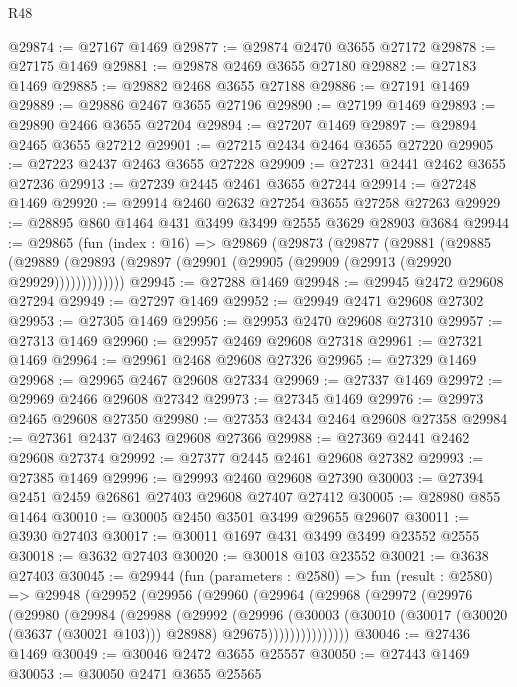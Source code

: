 \begin{lexlean}{R48}
\begin{coremodule}
@29874 := @27167 @1469
@29877 := @29874 @2470 @3655 @27172
@29878 := @27175 @1469
@29881 := @29878 @2469 @3655 @27180
@29882 := @27183 @1469
@29885 := @29882 @2468 @3655 @27188
@29886 := @27191 @1469
@29889 := @29886 @2467 @3655 @27196
@29890 := @27199 @1469
@29893 := @29890 @2466 @3655 @27204
@29894 := @27207 @1469
@29897 := @29894 @2465 @3655 @27212
@29901 := @27215 @2434 @2464 @3655 @27220
@29905 := @27223 @2437 @2463 @3655 @27228
@29909 := @27231 @2441 @2462 @3655 @27236
@29913 := @27239 @2445 @2461 @3655 @27244
@29914 := @27248 @1469
@29920 := @29914 @2460 @2632 @27254 @3655 @27258 @27263
@29929 := @28895 @860 @1464 @431 @3499 @3499 @2555 @3629 @28903 @3684
@29944 := @29865
    (fun (index : @16) =>
    @29869
      (@29873
        (@29877
          (@29881
            (@29885
              (@29889 (@29893 (@29897 (@29901 (@29905 (@29909 (@29913 (@29920 @29929)))))))))))))
@29945 := @27288 @1469
@29948 := @29945 @2472 @29608 @27294
@29949 := @27297 @1469
@29952 := @29949 @2471 @29608 @27302
@29953 := @27305 @1469
@29956 := @29953 @2470 @29608 @27310
@29957 := @27313 @1469
@29960 := @29957 @2469 @29608 @27318
@29961 := @27321 @1469
@29964 := @29961 @2468 @29608 @27326
@29965 := @27329 @1469
@29968 := @29965 @2467 @29608 @27334
@29969 := @27337 @1469
@29972 := @29969 @2466 @29608 @27342
@29973 := @27345 @1469
@29976 := @29973 @2465 @29608 @27350
@29980 := @27353 @2434 @2464 @29608 @27358
@29984 := @27361 @2437 @2463 @29608 @27366
@29988 := @27369 @2441 @2462 @29608 @27374
@29992 := @27377 @2445 @2461 @29608 @27382
@29993 := @27385 @1469
@29996 := @29993 @2460 @29608 @27390
@30003 := @27394 @2451 @2459 @26861 @27403 @29608 @27407 @27412
@30005 := @28980 @855 @1464
@30010 := @30005 @2450 @3501 @3499 @29655 @29607
@30011 := @3930 @27403
@30017 := @30011 @1697 @431 @3499 @3499 @23552 @2555
@30018 := @3632 @27403
@30020 := @30018 @103 @23552
@30021 := @3638 @27403
@30045 := @29944
    (fun (parameters : @2580) =>
    fun (result : @2580) =>
    @29948
      (@29952
        (@29956
          (@29960
            (@29964
              (@29968
                (@29972
                  (@29976
                    (@29980
                      (@29984
                        (@29988
                          (@29992
                            (@29996
                              (@30003
                                (@30010
                                  (@30017 (@30020 (@3637 (@30021 @103))) @28988)
                                  @29675)))))))))))))))
@30046 := @27436 @1469
@30049 := @30046 @2472 @3655 @25557
@30050 := @27443 @1469
@30053 := @30050 @2471 @3655 @25565

\end{coremodule}
\end{lexlean}
